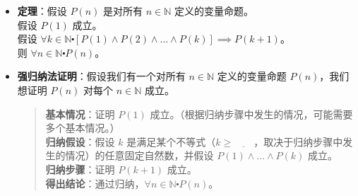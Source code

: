 \begin{itemize}
    \item \textbf{定理}：假设 $P(n)$ 是对所有 $n \in \mathbb{N}$ 定义的变量命题。\\
          假设 $P(1)$ 成立。\\
          假设 $\forall k \in \mathbb{N} \centerdot [P(1) \land P(2) \land \dots \land P(k)] \implies P(k + 1)$。\\
          则 $\forall n \in \mathbb{N} \centerdot P(n)$。
    \item \textbf{强归纳法证明}：假设我们有一个对所有 $n \in \mathbb{N}$ 定义的变量命题 $P(n)$，我们想证明 $P(n)$ 对每个 $n \in \mathbb{N}$ 成立。
          \begin{quote}
              \textbf{基本情况}：证明 $P(1)$ 成立。（根据归纳步骤中发生的情况，可能需要多个基本情况。）\\
              \textbf{归纳假设}：假设 $k$ 是满足某个不等式（$k \ge \underline{\qquad}$，取决于归纳步骤中发生的情况）的任意固定自然数，并假设 $P(1) \land \dots \land P(k)$ 成立。\\
              \textbf{归纳步骤}：证明 $P(k + 1)$ 成立。\\
              \textbf{得出结论}：通过归纳，$\forall n \in \mathbb{N} \centerdot P(n)$。
          \end{quote}
\end{itemize}
